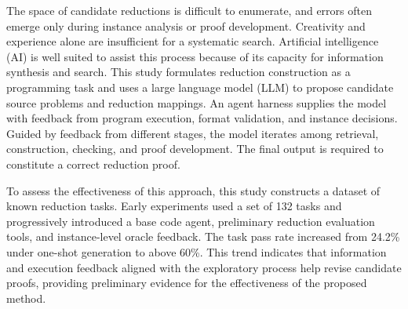 The space of candidate reductions is difficult to enumerate, and errors often emerge only during instance analysis or proof development. Creativity and experience alone are insufficient for a systematic search. Artificial intelligence (AI) is well suited to assist this process because of its capacity for information synthesis and search. This study formulates reduction construction as a programming task and uses a large language model (LLM) to propose candidate source problems and reduction mappings. An agent harness supplies the model with feedback from program execution, format validation, and instance decisions. Guided by feedback from different stages, the model iterates among retrieval, construction, checking, and proof development. The final output is required to constitute a correct reduction proof.

To assess the effectiveness of this approach, this study constructs a dataset of known reduction tasks. Early experiments used a set of 132 tasks and progressively introduced a base code agent, preliminary reduction evaluation tools, and instance-level oracle feedback. The task pass rate increased from 24.2\% under one-shot generation to above 60\%. This trend indicates that information and execution feedback aligned with the exploratory process help revise candidate proofs, providing preliminary evidence for the effectiveness of the proposed method.

